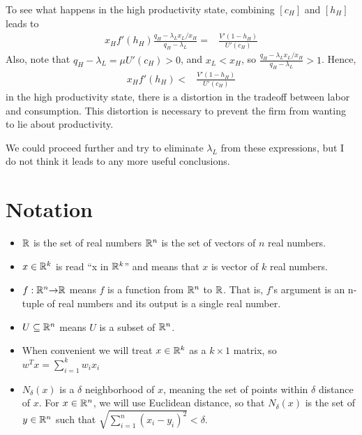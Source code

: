 \begin{example}
\begin{enumerate}
    To see what happens in the high productivity state, combining $[c_H]$ and $[h_H]$ leads to
    \begin{align}
      x_H f'(h_H)\frac{q_H - \lambda_L x_L/x_H}{q_H - \lambda_L} = &
                                                                     \frac{V'(1-h_H)}{U'(c_H)} \label{eq:h}  
    \end{align}
    Also, note that $q_H - \lambda_L = \mu U'(c_H) > 0$, and $x_L <
    x_H$, so $\frac{q_H - \lambda_L x_L/x_H}{q_H - \lambda_L} >
    1$. Hence,
    \begin{align}
      x_H f'(h_H) < & \frac{V'(1-h_H)}{U'(c_H)} \label{eq:h}  
    \end{align}
    in the high productivity state, there is a distortion in the
    tradeoff between labor and consumption. This distortion is
    necessary to prevent the firm from wanting to lie about
    productivity.

    We could proceed further and try to eliminate $\lambda_L$ from
    these expressions, but I do not think it leads to any more useful
    conclusions. 
  \end{enumerate}
\end{example}

\appendix

\section{Notation \label{sec:notation}}
\begin{itemize}
\item $\mathbb{R}$ is the set of real numbers $\mathbb{R}^n$ is the set of
  vectors of $n$ real numbers.
\item $x \in \mathbb{R}^k$ is read ``x in $\mathbb{R}^k$'' and means that $x$ is
  vector of $k$ real numbers.
\item $f: \mathbb{R}^n {\rightarrow} \mathbb{R}$ means $f$ is a function from $\mathbb{R}^n$ to
  $\mathbb{R}$. That is, $f$'s argument is an n-tuple of real numbers and
  its output is a single real number.
\item $U \subseteq \mathbb{R}^n$ means $U$ is a subset of $\mathbb{R}^n$. 
\item When convenient we will treat $x \in \mathbb{R}^k$ as a $k \times 1$
  matrix, so $w^T x = \sum_{i=1}^k w_i x_i$
\item $N_\delta(x)$ is a $\delta$ neighborhood of $x$, meaning the set
  of points within $\delta$ distance of $x$. For $x \in \mathbb{R}^n$, we will
  use Euclidean distance, so that $N_\delta(x)$ is the set of $y \in
  \mathbb{R}^n$ such that $\sqrt{\sum_{i=1}^n (x_i - y_i)^2} < \delta$.
\end{itemize}


